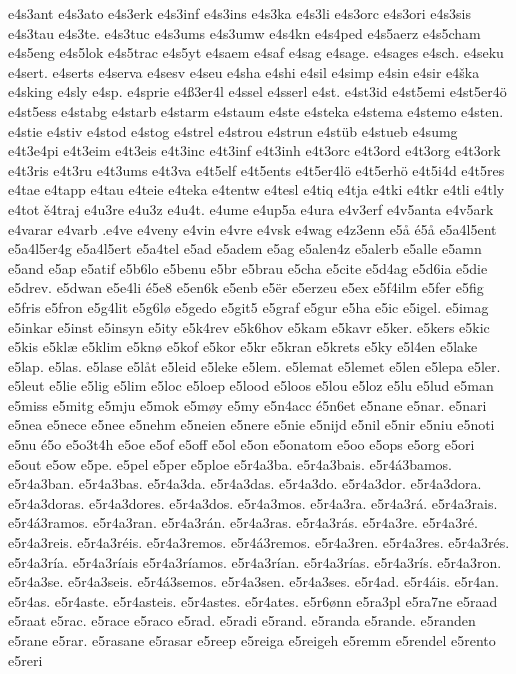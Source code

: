 e4s3ant
e4s3ato
e4s3erk
e4s3inf
e4s3ins
e4s3ka
e4s3li
e4s3orc
e4s3ori
e4s3sis
e4s3tau
e4s3te.
e4s3tuc
e4s3ums
e4s3umw
e4s4kn
e4s4ped
e4s5aerz
e4s5cham
e4s5eng
e4s5lok
e4s5trac
e4s5yt
e4saem
e4saf
e4sag
e4sage.
e4sages
e4sch.
e4seku
e4sert.
e4serts
e4serva
e4sesv
e4seu
e4sha
e4shi
e4sil
e4simp
e4sin
e4sir
e4ška
e4sking
e4sly
e4sp.
e4sprie
e4ß3er4l
e4ssel
e4sserl
e4st.
e4st3id
e4st5emi
e4st5er4ö
e4st5ess
e4stabg
e4starb
e4starm
e4staum
e4ste
e4steka
e4stema
e4stemo
e4sten.
e4stie
e4stiv
e4stod
e4stog
e4strel
e4strou
e4strun
e4stüb
e4stueb
e4sumg
e4t3e4pi
e4t3eim
e4t3eis
e4t3inc
e4t3inf
e4t3inh
e4t3orc
e4t3ord
e4t3org
e4t3ork
e4t3ris
e4t3ru
e4t3ums
e4t3va
e4t5elf
e4t5ents
e4t5er4lö
e4t5erhö
e4t5i4d
e4t5res
e4tae
e4tapp
e4tau
e4teie
e4teka
e4tentw
e4tesl
e4tiq
e4tja
e4tki
e4tkr
e4tli
e4tly
e4tot
ě4traj
e4u3re
e4u3z
e4u4t.
e4ume
e4up5a
e4ura
e4v3erf
e4v5anta
e4v5ark
e4varar
e4varb
.e4ve
e4veny
e4vin
e4vre
e4vsk
e4wag
e4z3enn
e5å
é5å
e5a4l5ent
e5a4l5er4g
e5a4l5ert
e5a4tel
e5ad
e5adem
e5ag
e5alen4z
e5alerb
e5alle
e5amn
e5and
e5ap
e5atif
e5b6lo
e5benu
e5br
e5brau
e5cha
e5cite
e5d4ag
e5d6ia
e5die
e5drev.
e5dwan
e5e4li
é5e8
e5en6k
e5enb
e5ër
e5erzeu
e5ex
e5f4ilm
e5fer
e5fig
e5fris
e5fron
e5g4lit
e5g6lø
e5gedo
e5git5
e5graf
e5gur
e5ha
e5ic
e5igel.
e5imag
e5inkar
e5inst
e5insyn
e5ity
e5k4rev
e5k6hov
e5kam
e5kavr
e5ker.
e5kers
e5kic
e5kis
e5klæ
e5klim
e5knø
e5kof
e5kor
e5kr
e5kran
e5krets
e5ky
e5l4en
e5lake
e5lap.
e5las.
e5lase
e5låt
e5leid
e5leke
e5lem.
e5lemat
e5lemet
e5len
e5lepa
e5ler.
e5leut
e5lie
e5lig
e5lim
e5loc
e5loep
e5lood
e5loos
e5lou
e5loz
e5lu
e5lud
e5man
e5miss
e5mitg
e5mju
e5mok
e5møy
e5my
e5n4acc
é5n6et
e5nane
e5nar.
e5nari
e5nea
e5nece
e5nee
e5nehm
e5neien
e5nere
e5nie
e5nijd
e5nil
e5nir
e5niu
e5noti
e5nu
é5o
e5o3t4h
e5oe
e5of
e5off
e5ol
e5on
e5onatom
e5oo
e5ops
e5org
e5ori
e5out
e5ow
e5pe.
e5pel
e5per
e5ploe
e5r4a3ba.
e5r4a3bais.
e5r4á3bamos.
e5r4a3ban.
e5r4a3bas.
e5r4a3da.
e5r4a3das.
e5r4a3do.
e5r4a3dor.
e5r4a3dora.
e5r4a3doras.
e5r4a3dores.
e5r4a3dos.
e5r4a3mos.
e5r4a3ra.
e5r4a3rá.
e5r4a3rais.
e5r4á3ramos.
e5r4a3ran.
e5r4a3rán.
e5r4a3ras.
e5r4a3rás.
e5r4a3re.
e5r4a3ré.
e5r4a3reis.
e5r4a3réis.
e5r4a3remos.
e5r4á3remos.
e5r4a3ren.
e5r4a3res.
e5r4a3rés.
e5r4a3ría.
e5r4a3ríais
e5r4a3ríamos.
e5r4a3rían.
e5r4a3rías.
e5r4a3rís.
e5r4a3ron.
e5r4a3se.
e5r4a3seis.
e5r4á3semos.
e5r4a3sen.
e5r4a3ses.
e5r4ad.
e5r4áis.
e5r4an.
e5r4as.
e5r4aste.
e5r4asteis.
e5r4astes.
e5r4ates.
e5r6ønn
e5ra3pl
e5ra7ne
e5raad
e5raat
e5rac.
e5race
e5raco
e5rad.
e5radi
e5rand.
e5randa
e5rande.
e5randen
e5rane
e5rar.
e5rasane
e5rasar
e5reep
e5reiga
e5reigeh
e5remm
e5rendel
e5rento
e5reri
